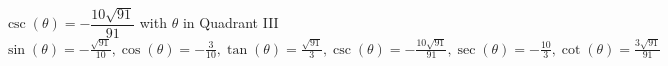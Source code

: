 {$\csc(\theta) = -\dfrac{10\sqrt{91}}{91}$ with $\theta$ in Quadrant III}
{$\sin(\theta) = -\frac{\sqrt{91}}{10}, \cos(\theta) = -\frac{3}{10}, \tan(\theta) = \frac{\sqrt{91}}{3}, \csc(\theta) = -\frac{10\sqrt{91}}{91}, \sec(\theta) = -\frac{10}{3}, \cot(\theta) = \frac{3\sqrt{91}}{91}$}